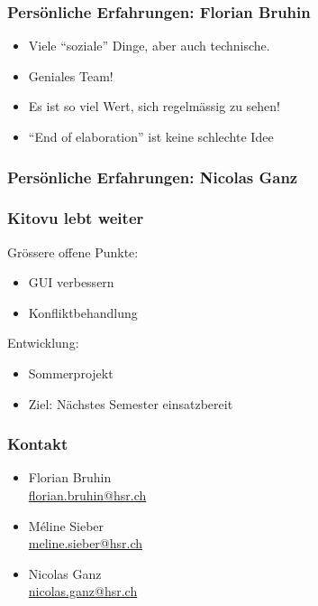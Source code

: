 \documentclass{beamer}
\begin{document}
	\begin{frame}
	   	\frametitle{Persönliche Erfahrungen: Florian Bruhin}
      \begin{itemize}
        \item Viele ``soziale'' Dinge, aber auch technische.
        \item Geniales Team!
        \item Es ist so viel Wert, sich regelmässig zu sehen!
        \item ``End of elaboration'' ist keine schlechte Idee
      \end{itemize}
	\end{frame}

  \begin{frame}
    \frametitle{Persönliche Erfahrungen: Nicolas Ganz}
  \end{frame}

  \begin{frame}
  \frametitle{Kitovu lebt weiter}

  Grössere offene Punkte:
  \begin{itemize}
    \item GUI verbessern
    \item Konfliktbehandlung
  \end{itemize}

  Entwicklung:
  \begin{itemize}
    \item Sommerprojekt
    \item Ziel: Nächstes Semester einsatzbereit
  \end{itemize}
  \end{frame}

  \begin{frame}
  \frametitle{Kontakt}
  \begin{itemize}
    \item Florian Bruhin \\ \url{florian.bruhin@hsr.ch} \\[2em]
    \item Méline Sieber \\ \url{meline.sieber@hsr.ch} \\[2em]
    \item Nicolas Ganz \\ \url{nicolas.ganz@hsr.ch}
  \end{itemize}
  \end{frame}
\end{document}
